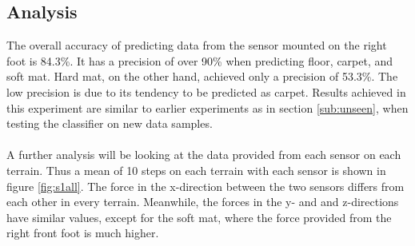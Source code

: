 \documentclass[USenglish]{ifimaster}  %
\begin{document}
\subsection{Analysis} 	
The overall accuracy of predicting data from the sensor mounted on the right foot is 84.3\%. It has a precision of over 90\% when predicting floor, carpet, and  soft mat. Hard mat, on the other hand, achieved only a precision of 53.3\%. The low precision is due to its tendency to be predicted as carpet. Results achieved in this experiment are similar to earlier experiments as in section \ref{sub:unseen}, when testing the classifier on new data samples. 
\\
\\
A further analysis will be looking at the data provided from each sensor on each terrain. Thus a mean of 10 steps on each terrain with each sensor is shown in figure \ref{fig:s1all}. The force in the x-direction between the two sensors differs from each other in every terrain. Meanwhile, the forces in the y- and and z-directions have similar values, except for the soft mat, where the force provided from the right front foot is much higher.
\end{document}
